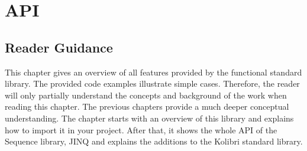 \chapter{API} %
\label{chap:api}

\section*{Reader Guidance} %
\label{sec:api_reader_guidance}
This chapter gives an overview of all features provided by the functional
standard library. The provided code examples illustrate simple cases.
Therefore, the reader will only partially understand the concepts and
background of the work when reading this chapter. The previous chapters provide
a much deeper conceptual understanding.
The chapter starts with an overview of this library and explains how to import
it in your project. After that, it shows the whole API of the Sequence library,
JINQ and explains the additions to the Kolibri standard library.








